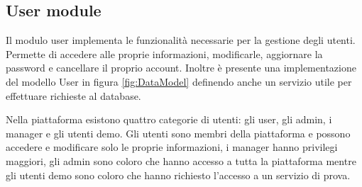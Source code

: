 \subsection{User module}
Il modulo user implementa le funzionalità necessarie per la gestione degli utenti.
Permette di accedere alle proprie informazioni, modificarle, aggiornare la password e cancellare il proprio account.
Inoltre è presente una implementazione del modello User in figura \ref{fig:DataModel} definendo anche un servizio utile per
effettuare richieste al database.

Nella piattaforma esistono quattro categorie di utenti: gli user, gli admin, i manager e gli utenti demo.
Gli utenti sono membri della piattaforma e possono accedere e modificare solo le proprie informazioni,
i manager hanno privilegi maggiori, gli admin sono coloro che hanno accesso a tutta la piattaforma mentre gli utenti demo
sono coloro che hanno richiesto l'accesso a un servizio di prova.

